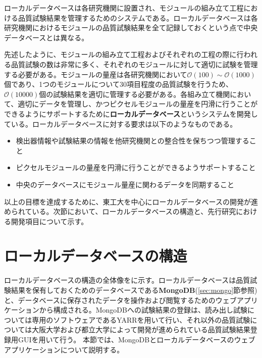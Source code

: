 ローカルデータベースは各研究機関に設置され、モジュールの組み立て工程における品質試験結果を管理するためのシステムである。ローカルデータベースは各研究機関におけるモジュールの品質試験結果を全て記録しておくという点で中央データベースとは異なる。

先述したように、モジュールの組み立て工程およびそれぞれの工程の際に行われる品質試験の数は非常に多く、それぞれのモジュールに対して適切に試験を管理する必要がある。モジュールの量産は各研究機関において$\mathcal{O}(100)\sim \mathcal{O}(1000)$個であり、1つのモジュールについて$30$項目程度の品質試験を行うため、$\mathcal{O}(10000)$個の試験結果を適切に管理する必要がある。各組み立て機関において、適切にデータを管理し、かつピクセルモジュールの量産を円滑に行うことができるようにサポートするために\textbf{ローカルデータベース}というシステムを開発している。ローカルデータベースに対する要求は以下のようなものである。
\begin{itemize}
  \item 検出器情報や試験結果の情報を他研究機関との整合性を保ちつつ管理すること
  \item ピクセルモジュールの量産を円滑に行うことができるようサポートすること
  \item 中央のデータベースにモジュール量産に関わるデータを同期すること
\end{itemize}

以上の目標を達成するために、東工大を中心にローカルデータベースの開発が進められている。次節において、ローカルデータベースの構造と、先行研究における開発項目について示す。

\section{ローカルデータベースの構造}
\label{sec:AboutLocalDB}
ローカルデータベースの構造の全体像をに示す。ローカルデータベースは品質試験結果を保有しておくためのデータベースである\textbf{MongoDB}(\ref{sec:mongo}節参照)と、データベースに保存されたデータを操作および閲覧するためのウェブアプリケーションから構成される。MongoDBへの試験結果の登録は、読み出し試験については専用のソフトウェアであるYARRを用いて行い、それ以外の品質試験については大阪大学および都立大学によって開発が進められている品質試験結果登録用GUIを用いて行う。
本節では、MongoDBとローカルデータベースのウェブアプリケーションについて説明する。


